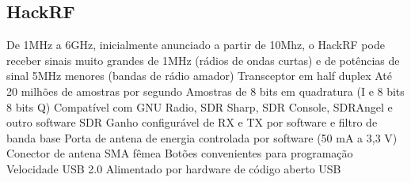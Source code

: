 \documentclass[
  12pt,				%
  openright,			%
  twoside,			%
  a4paper,			%
  english,			%
  french,				%
  spanish,			%
  brazil,				%
  ]{abntex2}
\begin{document}











\subsection*{HackRF}


De 1MHz a 6GHz, inicialmente anunciado a partir de 10Mhz, o HackRF pode receber sinais muito grandes de 1MHz (rádios de ondas curtas) e de potências de
sinal 5MHz menores (bandas de rádio amador)
Transceptor em half duplex
Até 20 milhões de amostras por segundo
Amostras de 8 bits em quadratura (I e 8 bits 8 bits Q)
Compatível com GNU Radio, SDR Sharp, SDR Console, SDRAngel e outro software SDR
Ganho configurável de RX e TX por software e filtro de banda base
Porta de antena de energia controlada por software (50 mA a 3,3 V)
Conector de antena SMA fêmea
Botões convenientes para programação
Velocidade USB 2.0
Alimentado por hardware de código aberto USB
\end{document}
